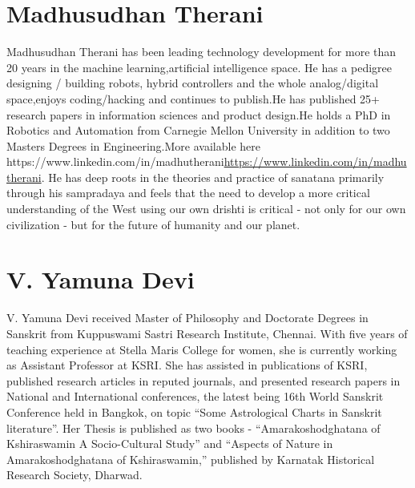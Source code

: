 \section*{Madhusudhan Therani}

Madhusudhan Therani has been leading technology development for more than 20 years in the machine learning,artificial intelligence\break
 space. He has a pedigree designing / building robots, hybrid controllers and the whole analog/digital space,enjoys coding/hacking and continues to publish.He has published 25+ research papers in information sciences and product design.He holds a PhD in Robotics and Automation from Carnegie Mellon University in addition to two Masters Degrees in Engineering.More available here https://www.linkedin.com/in/madhutherani\url{https://www.linkedin.com/in/madhutherani}. He has deep roots in the theories and practice of sanatana primarily through his sampradaya and feels that the need to develop a more critical understanding of the West using our own drishti is critical - not only for our own civilization - but for the future of humanity and our planet.

\section*{V. Yamuna Devi}

V. Yamuna Devi received Master of Philosophy and Doctorate Degrees in Sanskrit from Kuppuswami Sastri Research Institute, Chennai. With five years of teaching experience at Stella Maris College for women, she is currently working as Assistant Professor at KSRI. She has assisted in publications of KSRI, published research articles in reputed journals, and presented research papers in National and International conferences, the latest being 16th World Sanskrit Conference held in Bangkok, on topic “Some Astrological Charts in Sanskrit literature”. Her Thesis is published as two books - “Amarakoshodghatana of Kshiraswamin A Socio-Cultural Study” and “Aspects of Nature in Amarakoshodghatana of Kshiraswamin,” published by Karnatak Historical Research Society, Dharwad.

